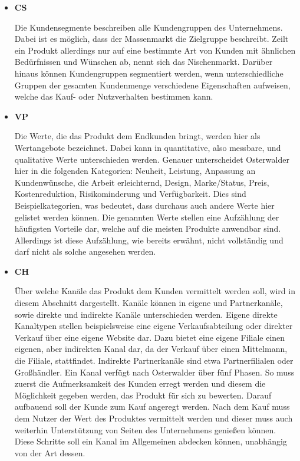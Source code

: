 \begin{itemize}
	\item \textbf{\ac{CS}}
	
	Die Kundensegmente beschreiben alle Kundengruppen des Unternehmens. Dabei ist es möglich, dass der Massenmarkt die Zielgruppe beschreibt. Zeilt ein Produkt allerdings nur auf eine bestimmte Art von Kunden mit ähnlichen Bedürfnissen und Wünschen ab, nennt sich das Nischenmarkt. Darüber hinaus können Kundengruppen segmentiert werden, wenn unterschiedliche Gruppen der gesamten Kundenmenge verschiedene Eigenschaften aufweisen, welche das Kauf- oder Nutzverhalten bestimmen kann. 
	
	\item \textbf{\ac{VP}}
	
	Die Werte, die das Produkt dem Endkunden bringt, werden hier als Wertangebote bezeichnet. Dabei kann in quantitative, also messbare, und qualitative Werte unterschieden werden. Genauer unterscheidet Osterwalder hier in die folgenden Kategorien: Neuheit, Leistung, Anpassung an Kundenwünsche, die Arbeit erleichternd, Design, Marke/Status, Preis, Kostenreduktion, Risikominderung und Verfügbarkeit. Dies sind Beispielkategorien, was bedeutet, dass durchaus auch andere Werte hier gelistet werden können. Die genannten Werte stellen eine Aufzählung der häufigsten Vorteile dar, welche auf die meisten Produkte anwendbar sind. Allerdings ist diese Aufzählung, wie bereits erwähnt, nicht vollständig und darf nicht als solche angesehen werden. 
	
	\item \textbf{\ac{CH}}
	
	Über welche Kanäle das Produkt dem Kunden vermittelt werden soll, wird in diesem Abschnitt dargestellt. Kanäle können in eigene und Partnerkanäle, sowie direkte und indirekte Kanäle unterschieden werden. Eigene direkte Kanaltypen stellen beispielsweise eine eigene Verkaufsabteilung oder direkter Verkauf über eine eigene Website dar. Dazu bietet eine eigene Filiale einen eigenen, aber indirekten Kanal dar, da der Verkauf über einen Mittelmann, die Filiale, stattfindet. Indirekte Partnerkanäle sind etwa Partnerfilialen oder Großhändler. Ein Kanal verfügt nach Osterwalder über fünf Phasen. So muss zuerst die Aufmerksamkeit des Kunden erregt werden und diesem die Möglichkeit gegeben werden, das Produkt für sich zu bewerten. Darauf aufbauend soll der Kunde zum Kauf angeregt werden. Nach dem Kauf muss dem Nutzer der Wert des Produktes vermittelt werden und dieser muss auch weiterhin Unterstützung von Seiten des Unternehmens genießen können. Diese Schritte soll ein Kanal im Allgemeinen abdecken können, unabhängig von der Art dessen.
	

\end{itemize}
